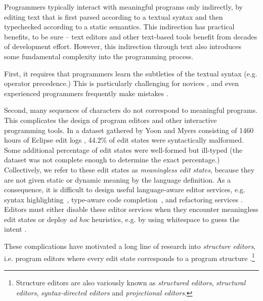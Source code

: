 
Programmers typically interact with meaningful programs only
indirectly, by editing text that is first parsed according to a textual
syntax and then typechecked according to a static semantics. This
indirection has practical benefits, to be sure -- text editors and other
text-based tools benefit from decades of development effort. However, this indirection through text also
introduces some fundamental complexity into the programming process.

First, it requires that programmers learn the subtleties of the textual
syntax (e.g. operator precedence.) This is particularly 
challenging for novices \cite{Altadmri:2015:MCI:2676723.2677258,stefik2013empirical,Marceau:2011:VGT:2016911.2016921}, and even experienced programmers frequently make mistakes \cite{7548903,jones2006developer,Marceau:2011:VGT:2016911.2016921}.

Second, many sequences of characters do not correspond to meaningful
programs. This complicates the design of program editors and other interactive programming tools. 
In a dataset  
gathered by Yoon and Myers consisting of 1460 hours of Eclipse edit logs  \cite{6883030}, 44.2\% of
edit states were syntactically malformed. Some additional
percentage of edit states were well-formed but ill-typed (the dataset was
not complete enough to determine the exact percentage.) Collectively, we refer to these edit states as \emph{meaningless edit states}, because they are not given static or dynamic meaning by the language definition. 
As a consequence, it is difficult
to design useful language-aware editor services, e.g. syntax
highlighting~\cite{sarkar2015impact}, type-aware code
completion~\cite{Mooty:2010:CCC:1915084.1916348,Omar:2012:ACC:2337223.2337324},
and refactoring services \cite{mens2004survey}. Editors must either disable
these editor services when they encounter meaningless edit states or
deploy \emph{ad hoc} heuristics, e.g. by using whitespace to guess the intent \cite{DBLP:conf/oopsla/KatsJNV09,DBLP:conf/sle/JongeNKV09}.

These complications have motivated a long line of research
into \emph{structure editors}, i.e. program editors where every edit state
corresponds to a program structure \cite{teitelbaum_cornell_1981}.\footnote{Structure editors are also variously known as \emph{structured editors}, \emph{structural editors}, \emph{syntax-directed editors} and \emph{projectional editors}.}

